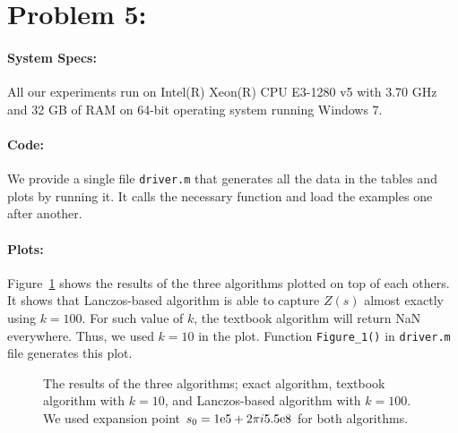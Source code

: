 \section*{Problem 5:}
\paragraph{System Specs:} All our experiments run on Intel(R) Xeon(R) CPU E3-1280 v5 with 3.70 GHz and 32 GB of RAM on 64-bit operating system running Windows 7. 

\paragraph{Code:} We provide a single file \texttt{driver.m} that generates all the data in the tables and plots by running it. It calls the necessary function and load the examples one after another. 
 
\paragraph{Plots:} Figure~\ref{fig:all} shows the results of the three algorithms plotted on top of each others. It shows that Lanczos-based algorithm is able to capture $Z(s)$ almost exactly using $k=100$. For such value of $k$, the textbook algorithm will return NaN everywhere. Thus, we used $k=10$ in the plot. Function \texttt{Figure\_1()} in \texttt{driver.m} file generates this plot. 

\begin{figure}[!tbh]
\centering        
   \caption{The results of the three algorithms; exact algorithm, textbook algorithm with $k=10$, and Lanczos-based algorithm with $k=100$. We used expansion point $s_{0} = {1}\mathrm{e}{5} + 2\pi i {5.5}\mathrm{e}{8}$ for both algorithms.   }
   \label{fig:all}
\end{figure}

